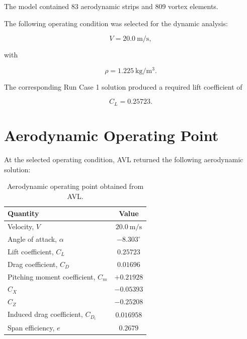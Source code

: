 \documentclass[11pt,a4paper]{article}
\begin{document}
The model contained 83 aerodynamic strips and 809 vortex elements.

The following operating condition was selected for the dynamic analysis:

\begin{equation}
V=20.0~\mathrm{m/s},
\end{equation}

with

\begin{equation}
\rho=1.225~\mathrm{kg/m^3}.
\end{equation}

The corresponding Run Case 1 solution produced a required lift coefficient
of

\begin{equation}
C_L=0.25723.
\end{equation}

\section{Aerodynamic Operating Point}

At the selected operating condition, AVL returned the following
aerodynamic solution:

\begin{table}[H]
\centering
\caption{Aerodynamic operating point obtained from AVL.}
\label{tab:operating_point}
\begin{tabular}{lc}
\toprule
Quantity & Value \\
\midrule
Velocity, $V$ & $20.0~\mathrm{m/s}$ \\
Angle of attack, $\alpha$ & $-8.303^\circ$ \\
Lift coefficient, $C_L$ & $0.25723$ \\
Drag coefficient, $C_D$ & $0.01696$ \\
Pitching moment coefficient, $C_m$ & $+0.21928$ \\
$C_X$ & $-0.05393$ \\
$C_Z$ & $-0.25208$ \\
Induced drag coefficient, $C_{D_i}$ & $0.016958$ \\
Span efficiency, $e$ & $0.2679$ \\
\bottomrule
\end{tabular}
\end{table}

\end{document}
